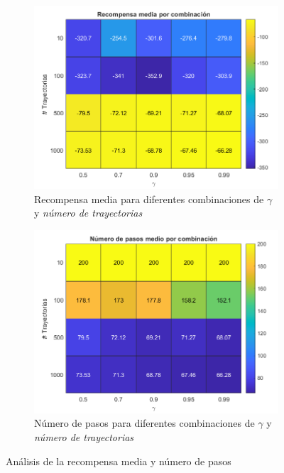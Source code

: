 \begin{figure}[H]
    \centering
    \begin{subfigure}{0.7\textwidth}
        \centering
        \includegraphics[width=\textwidth]{../../experiments/directEstimation/experiment-1/results/reward.png}
        \caption{Recompensa media para diferentes combinaciones de $\gamma$ y \textit{número de trayectorias}}
        \label{fig:directEstimation-subfig-reward}
    \end{subfigure}
    \hfill
    \begin{subfigure}{0.7\textwidth}
        \centering
        \includegraphics[width=\textwidth]{../../experiments/directEstimation/experiment-1/results/steps.png}
        \caption{Número de pasos para diferentes combinaciones de $\gamma$ y \textit{número de trayectorias}}
        \label{fig:directEstimation-subfig-steps}
    \end{subfigure}
    \caption{Análisis de la recompensa media y número de pasos}
    \label{fig:directEstimation-reward}
\end{figure}

